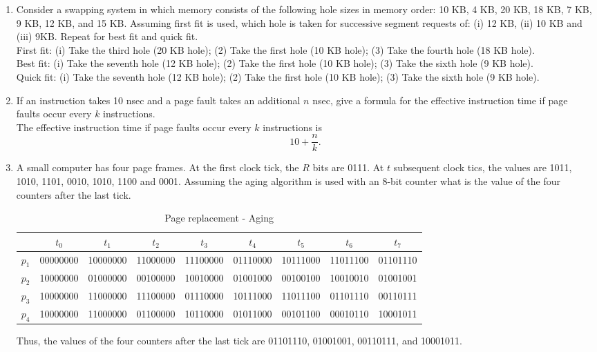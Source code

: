 \documentclass[a4paper]{article}
\begin{document}
\begin{enumerate}
    \item Consider a swapping system in which memory consists of the following hole sizes in memory order: 10 KB, 4 KB, 20 KB, 18 KB, 7 KB, 9 KB, 12 KB, and 15 KB. Assuming first fit is used, which hole is taken for successive segment requests of: (i) 12 KB, (ii) 10 KB and (iii) 9KB. Repeat for best fit and quick fit.\\
    First fit: (i) Take the third hole (20 KB hole); (2) Take the first hole (10 KB hole); (3) Take the fourth hole (18 KB hole).\\
    Best fit: (i) Take the seventh hole (12 KB hole); (2) Take the first hole (10 KB hole); (3) Take the sixth hole (9 KB hole).\\
    Quick fit: (i) Take the seventh hole (12 KB hole); (2) Take the first hole (10 KB hole); (3) Take the sixth hole (9 KB hole).
    \item If an instruction takes 10 nsec and a page fault takes an additional $n$ nsec, give a formula for the effective instruction time if page faults occur every $k$ instructions.\\
    The effective instruction time if page faults occur every $k$ instructions is
    \[10+\frac{n}{k}.\]
    \item A small computer has four page frames. At the first clock tick, the $R$ bits are 0111. At $t$ subsequent clock tics, the values are 1011, 1010, 1101, 0010, 1010, 1100 and 0001. Assuming the aging algorithm is used with an 8-bit counter what is the value of the four counters after the last tick.\\
    \begin{table}[H]
        \centering
        \begin{tabular}{|c|c|c|c|c|c|c|c|c|}
            \hline
            &$t_0$&$t_1$&$t_2$&$t_3$&$t_4$&$t_5$&$t_6$&$t_7$\\
            \hline
            $p_1$&00000000&10000000&11000000&11100000&01110000&10111000&11011100&01101110\\
            \hline
            $p_2$&10000000&01000000&00100000&10010000&01001000&00100100&10010010&01001001\\
            \hline
            $p_3$&10000000&11000000&11100000&01110000&10111000&11011100&01101110&00110111\\
            \hline
            $p_4$&10000000&11000000&01100000&10110000&01011000&00101100&00010110&10001011\\
            \hline
        \end{tabular}
        \caption{Page replacement - Aging}
    \end{table}
    Thus, the values of the four counters after the last tick are 01101110, 01001001, 00110111, and 10001011.
\end{enumerate}
\end{document}
